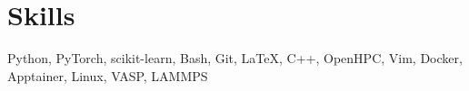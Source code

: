 \section{Skills}
Python, PyTorch, scikit-learn, Bash, Git, \LaTeX, C++, OpenHPC, Vim, Docker, Apptainer, Linux, VASP, LAMMPS
